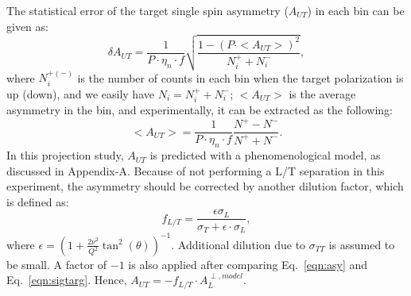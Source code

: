 The statistical error of the target single spin asymmetry ($A_{UT}$) in each
bin can be given as:
  \begin{equation}
    \delta A_{UT} = \frac{1}{P\cdot\eta_{n}\cdot f} \sqrt{\frac{1-(P\cdot
        <A_{UT}>)^{2}}{N^{+}_{i}+N^{-}_{i}}},
    \label{stat_err}
 \end{equation}
where $N^{+(-)}_{i}$ is the number of counts in each bin when the target
polarization is up (down), and we easily have $N_{i}=N^{+}_{i}+N^{-}_{i}$;
$<A_{UT}>$ is the average asymmetry in the bin, and experimentally, it can be
extracted as the following:
\begin{equation}
   <A_{UT}> = \frac{1}{P\cdot\eta_{n}\cdot f} \frac{N^{+}-N^{-}}{N^{+}+N^{-}}.
   \label{asym_exp}
\end{equation}
In this projection study, $A_{UT}$ is predicted with a phenomenological model,
as discussed in Appendix-A. Because of not performing a L/T separation in this
experiment, the asymmetry should be corrected by another dilution factor, which
is defined as:
\begin{equation}
  f_{L/T} =\frac{\epsilon\sigma_{L} }{\sigma_{T}+\epsilon\cdot\sigma_{L} },
\end{equation} 
where $\epsilon=(1+\frac{2\nu^{2}}{Q^{2}}\tan^{2}(\theta))^{-1}$. Additional
dilution due to $\sigma_{TT}$ is assumed to be small.  A factor of $-1$ is also
applied after comparing Eq.~\ref{eqn:asy} and Eq.~\ref{eqn:sigtarg}. Hence,
$A_{UT} = -f_{L/T}\cdot A_{L}^{\perp,model}$.

